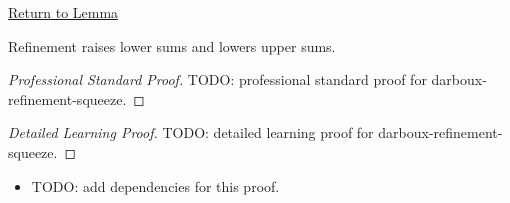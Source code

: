 \newpage
{}
\label{prf:darboux-refinement-squeeze}
\begin{remark*}[Return]\hyperref[lem:darboux-refinement-squeeze]{Return to Lemma}\end{remark*}

\begin{lemma*}
Refinement raises lower sums and lowers upper sums.
\end{lemma*}

\begin{proof}[Professional Standard Proof]
\LRAProofBodyStart
TODO: professional standard proof for darboux-refinement-squeeze.
\end{proof}

\begin{proof}[Detailed Learning Proof]
\LRAProofBodyStart
TODO: detailed learning proof for darboux-refinement-squeeze.
\end{proof}

\begin{remark*}
\end{remark*}

\begin{dependencies}
\begin{itemize}
  \item TODO: add dependencies for this proof.
\end{itemize}
\end{dependencies}

\clearpage
